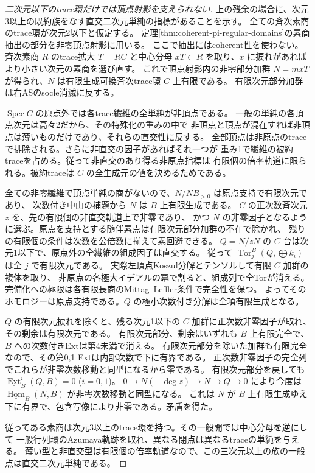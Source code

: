 \begin{proof}[二次元以下のtrace環だけでは頂点射影を支えられない]
上の残余の場合に、次元3以上の既約族をなす直交二次元単純の指標があることを示す。
全ての斉次素商のtrace環が次元2以下と仮定する。
定理\ref{thm:coherent-pi-regular-domains}の素商抽出の部分を非零頂点射影に用いる。
ここで抽出にはcoherent性を使わない。斉次素商 $R$ のtrace拡大 $T=RC$ と中心分母
$xT\subset R$ を取り、$x$ に捩れがあればより小さい次元の素商を選び直す。
これで頂点射影内の非零部分加群 $N=mxT$ が得られ、$N$ は有限生成可換斉次trace環 $C$ 上有限である。
有限次元部分加群は右ASのsocle消滅に反する。

$\operatorname{Spec} C$ の原点外では各trace繊維の全単純が非頂点である。
一般の単純の各頂点次元は高々2だから、その特殊化の重みの中で
非頂点と頂点が混在すれば非頂点は薄いものだけであり、それらの直交性に反する。
全部頂点は非原点のtraceで排除される。さらに非直交の因子があればそれ一つが
重み1で繊維の被約traceを占める。従って非直交のあり得る非原点指標は
有限個の倍率軌道に限られる。被約traceは $C$ の全生成元の値を決めるためである。

全ての非零繊維で頂点単純の商がないので、$N/NB_{>0}$ は原点支持で有限次元であり、
次数付き中山の補題から $N$ は $B$ 上有限生成である。
$C$ の正次数斉次元 $z$ を、先の有限個の非直交軌道上で非零であり、
かつ $N$ の非零因子となるように選ぶ。原点を支持とする随伴素点は有限次元部分加群の不在で除かれ、
残りの有限個の条件は次数を公倍数に揃えて素回避できる。
$Q=N/zN$ の $C$ 台は次元1以下で、原点外の全繊維の組成因子は直交する。
従って $\operatorname{Tor}^B_j(Q,\bigoplus k_i)$ は全 $j$ で有限次元である。
実際左頂点Koszul分解とテンソルして有限 $C$ 加群の複体を取り、
非原点の各極大イデアルの冪で割ると、組成列で全Torが消える。
完備化への極限は各有限長商のMittag--Leffler条件で完全性を保つ。
よってそのホモロジーは原点支持である。$Q$ の極小次数付き分解は全項有限生成となる。

$Q$ の有限次元捩れを除くと、残る次元1以下の $C$ 加群に正次数非零因子が取れ、その剰余は有限次元である。
有限次元部分、剰余はいずれも $B$ 上有限完全で、$B$ への次数付きExtは第4未満で消える。
有限次元部分を除いた加群も有限完全なので、その第0,1 Extは内部次数で下に有界である。
正次数非零因子の完全列でこれらが非零次数移動と同型になるから零である。
有限次元部分を戻しても $\underline{\operatorname{Ext}}^i_B(Q,B)=0$ ($i=0,1$)。
$0\to N(-\deg z)\to N\to Q\to0$ により今度は
$\underline{\operatorname{Hom}}_B(N,B)$ が非零次数移動と同型になる。
これは $N$ が $B$ 上有限生成ゆえ下に有界で、包含写像により非零である。矛盾を得た。

従ってある素商は次元3以上のtrace環を持つ。その一般開では中心分母を逆にして
一般行列環のAzumaya軌跡を取れ、異なる閉点は異なるtraceの単純を与える。
薄い型と非直交型は有限個の倍率軌道なので、この三次元以上の族の一般点は直交二次元単純である。
\end{proof}


